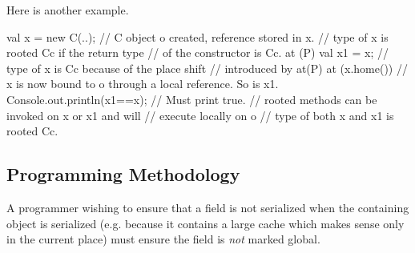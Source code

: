 Here is another example.
 \begin{xten}
val x = new C(..); 
// C object o created, reference stored in x. 
// type of x is rooted C{c} if the return type 
// of the constructor is C{c}. 
at (P) { 
    val x1 = x; 
    // type of x is C{c} because of the place shift 
    // introduced by at(P)
  at (x.home()) {
        // x is now bound to o through a local reference. So is x1.
    Console.out.println(x1==x); // Must print true.
      // rooted methods can be invoked on x or x1 and will 
      // execute locally on o
      // type of both x and x1 is rooted C{c}.
  }
}
\end{xten}
 
\subsection{Programming Methodology}

A programmer wishing to ensure that a  field is not serialized when
the containing object is serialized (e.g. because it contains a large
cache which makes sense only in the current place) must ensure the
field is \emph{not} marked global.


